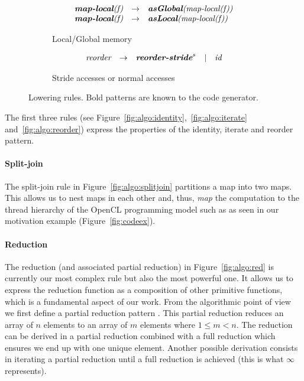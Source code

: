 \begin{figure}[t]
\vspace{-0.5em}
\begin{subfigure}[b]{1\linewidth}
\begin{mdframed}
$$
\begin{array}{lrl}
  \textit{\textbf{map-local}(f)} & \rightarrow & \textit{\textbf{asGlobal}(map-local(f))}\\  
  \textit{\textbf{map-local}(f)} & \rightarrow & \textit{\textbf{asLocal}(map-local(f))}\\  
\end{array}
$$
\end{mdframed}
  \caption{Local/Global memory}
  \label{fig:low:mem}
\end{subfigure}

\vspace{-0.5em}
\begin{subfigure}[b]{1\linewidth}
\begin{mdframed}
$$
\begin{array}{lllll}
  \textit{reorder}  & \rightarrow & \textit{\textbf{reorder-stride}}^s & | & \textit{id}
\end{array}
$$
\end{mdframed}
  \caption{Stride accesses or normal accesses}
  \label{fig:low:stride}
\end{subfigure}
\vspace{-2em}
\caption{Lowering rules. Bold patterns are known to the code generator.}
\label{fig:low}
\end{figure}



The first three rules (see Figure~\ref{fig:algo:identity},~\ref{fig:algo:iterate} and~\ref{fig:algo:reorder}) express the properties of the identity, iterate and reorder pattern.


\paragraph{Split-join}
The split-join rule in Figure~\ref{fig:algo:splitjoin} partitions a map into two maps.
This allows us to nest maps in each other and, thus, \emph{map} the computation to the thread hierarchy of the OpenCL programming model such as  as seen in our motivation example (Figure~\ref{fig:codeex}).


\paragraph{Reduction}
The reduction (and associated partial reduction) in Figure~\ref{fig:algo:red} is currently our most complex rule but also the most powerful one.
It allows us to express the reduction function as a composition of other primitive functions, which is a fundamental aspect of our work.
From the algorithmic point of view we first define a partial reduction pattern .
This partial reduction reduces an array of $n$ elements to an array of $m$ elements where $1 \leq m < n$.
The reduction can be derived in a partial reduction combined with a full reduction which ensures we end up with one unique element.
Another possible derivation consists in iterating a partial reduction until a full reduction is achieved (this is what $\infty$ represents).

